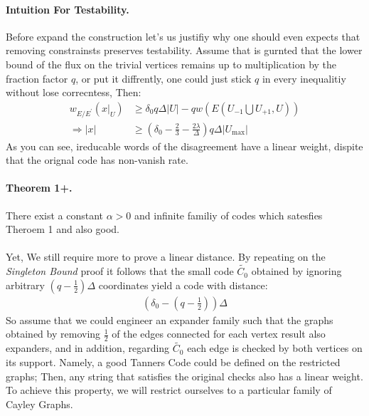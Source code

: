 \documentclass[sigplan,screen]{acmart}
\begin{document}
\begin{multicols*}{2}
 \paragraph{Intuition For Testability.} Before expand the construction let's us justifiy why one should even expects that removing constrainsts preserves testability. Assume that is gurnted that the lower bound of the flux on the trivial vertices remains up to multiplication by the fraction factor $q$, or put it diffrently, one could just stick $q$ in every inequalitiy without lose correcntess, Then: 
  \begin{equation*}
    \begin{split}
      w_{E/E^{\prime}}\left( x|_{U} \right) & \ge  \delta_{0}q\Delta|U| -qw\left( E(U_{-1} \bigcup U_{+1} ,U)  \right) \\ 
      \Rightarrow |x| & \ge \left(  \delta_{0} - \frac{2}{3} - \frac{2\lambda}{\Delta} \right) q \Delta|U_{\max}|
    \end{split}
  \end{equation*}
  As you can see, ireducable words of the disagreement have a linear weight, dispite that the orignal code has non-vanish rate.     
  
  \paragraph{Theorem 1+.} There exist a constant $\alpha > 0 $ and infinite familiy of codes which satesfies Theroem 1 and also good.
  \paragraph{}

  Yet, We still require more to prove a linear distance. 
   By repeating on the \emph{Singleton Bound} proof it follows that the small code $\tilde{C_{0}}$ obtained by ignoring arbitrary $ \left( q - \frac{1}{2} \right) \Delta $ coordinates yield a code with distance: 
  \begin{equation*}
    \begin{split}
      \left( \delta_{0} - \left( q - \frac{1}{2} \right) \right)\Delta
    \end{split}
  \end{equation*}
  So assume that we could engineer an expander family such that the graphs obtained by removing $\frac{1}{2}$ of the edges connected for each vertex result also expanders, and in addition, regarding $\tilde{C_{0}}$ each edge is checked by both vertices on its support. Namely, a good Tanners Code could be defined on the restricted graphs; Then, any string that satisfies the original checks also has a linear weight. To achieve this property, we will restrict ourselves to a particular family of Cayley Graphs.  

\end{multicols*}
\end{document}
